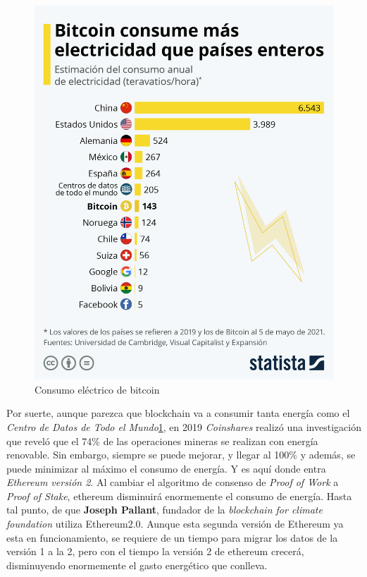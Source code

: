 \begin{figure}[h!]
  \centering
  \includegraphics[width=0.6\linewidth]{figs/ImpactoMedioAmbiente/electricidad_bitcoin}
  \caption[Consumo eléctrico de bitcoin]{Consumo eléctrico de bitcoin}
  \label{fig:electricidad_bitcoin}
\end{figure}

Por suerte, aunque parezca que blockchain va a consumir tanta energía como el \textit{Centro de Datos de Todo el Mundo}\ref{fig:electricidad_bitcoin}, en 2019 \emph{Coinshares} realizó una investigación\cite{coinshare} que reveló que el 74\% de las operaciones mineras se realizan con energía renovable. Sin embargo, siempre se puede mejorar, y llegar al 100\% y además, se puede minimizar al máximo el consumo de energía. Y es aquí donde entra \emph{Ethereum versión 2}\cite{Ethereum2.0}. Al cambiar el algoritmo de consenso de \textit{Proof of Work} a \textit{Proof of Stake}, ethereum disminuirá enormemente el consumo de energía. Hasta tal punto, de que \textbf{Joseph Pallant}, fundador de la \emph{blockchain for climate foundation}\cite{bkClimateF} utiliza Ethereum2.0. Aunque esta segunda versión de Ethereum ya esta en funcionamiento, se requiere de un tiempo para migrar los datos de la versión 1 a la 2, pero con el tiempo la versión 2 de ethereum crecerá, disminuyendo enormemente el gasto energético que conlleva. \\

